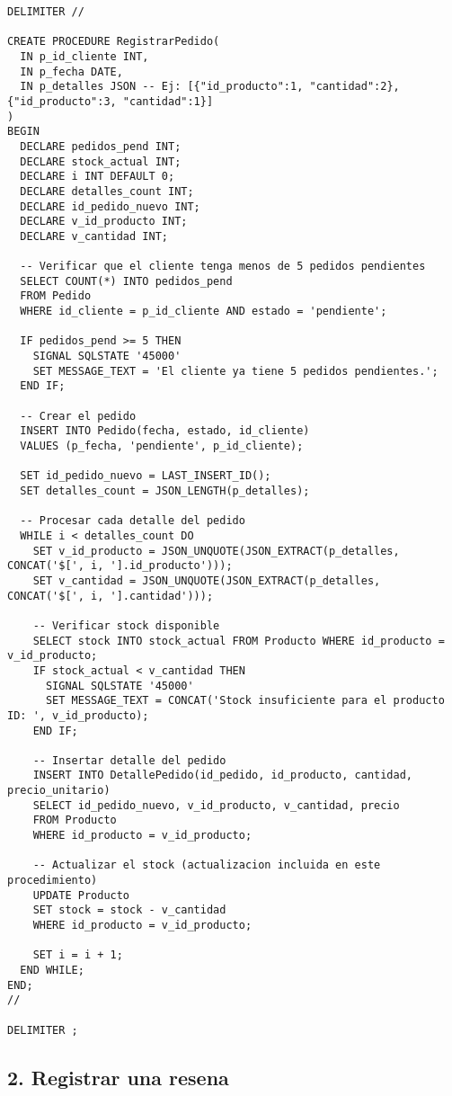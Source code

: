 \begin{lstlisting}
DELIMITER //

CREATE PROCEDURE RegistrarPedido(
  IN p_id_cliente INT,
  IN p_fecha DATE,
  IN p_detalles JSON -- Ej: [{"id_producto":1, "cantidad":2}, {"id_producto":3, "cantidad":1}]
)
BEGIN
  DECLARE pedidos_pend INT;
  DECLARE stock_actual INT;
  DECLARE i INT DEFAULT 0;
  DECLARE detalles_count INT;
  DECLARE id_pedido_nuevo INT;
  DECLARE v_id_producto INT;
  DECLARE v_cantidad INT;

  -- Verificar que el cliente tenga menos de 5 pedidos pendientes
  SELECT COUNT(*) INTO pedidos_pend
  FROM Pedido
  WHERE id_cliente = p_id_cliente AND estado = 'pendiente';

  IF pedidos_pend >= 5 THEN
    SIGNAL SQLSTATE '45000'
    SET MESSAGE_TEXT = 'El cliente ya tiene 5 pedidos pendientes.';
  END IF;

  -- Crear el pedido
  INSERT INTO Pedido(fecha, estado, id_cliente)
  VALUES (p_fecha, 'pendiente', p_id_cliente);

  SET id_pedido_nuevo = LAST_INSERT_ID();
  SET detalles_count = JSON_LENGTH(p_detalles);

  -- Procesar cada detalle del pedido
  WHILE i < detalles_count DO
    SET v_id_producto = JSON_UNQUOTE(JSON_EXTRACT(p_detalles, CONCAT('$[', i, '].id_producto')));
    SET v_cantidad = JSON_UNQUOTE(JSON_EXTRACT(p_detalles, CONCAT('$[', i, '].cantidad')));

    -- Verificar stock disponible
    SELECT stock INTO stock_actual FROM Producto WHERE id_producto = v_id_producto;
    IF stock_actual < v_cantidad THEN
      SIGNAL SQLSTATE '45000'
      SET MESSAGE_TEXT = CONCAT('Stock insuficiente para el producto ID: ', v_id_producto);
    END IF;

    -- Insertar detalle del pedido
    INSERT INTO DetallePedido(id_pedido, id_producto, cantidad, precio_unitario)
    SELECT id_pedido_nuevo, v_id_producto, v_cantidad, precio
    FROM Producto
    WHERE id_producto = v_id_producto;

    -- Actualizar el stock (actualizacion incluida en este procedimiento)
    UPDATE Producto
    SET stock = stock - v_cantidad
    WHERE id_producto = v_id_producto;

    SET i = i + 1;
  END WHILE;
END;
//

DELIMITER ;
\end{lstlisting}

\subsection{2. Registrar una resena}

